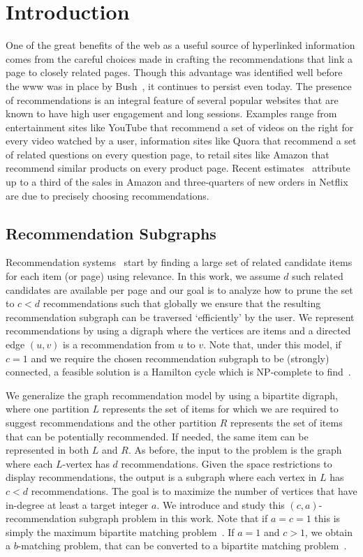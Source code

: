 
\section{Introduction}

One of the great benefits of the web as a useful source of hyperlinked
information comes from the careful choices made in crafting the
recommendations that link a page to closely related pages. Though this
advantage was identified well before the www was in place by
Bush~\cite{Bush45aswe}, it continues to persist even today. The
presence of recommendations is an integral feature of several popular
websites that are known to have high user engagement and long
sessions. Examples range from entertainment sites like YouTube that
recommend a set of videos on the right for every video watched by a
user, information sites like Quora that recommend a set of related
questions on every question page, to retail sites like Amazon that
recommend similar products on every product page. Recent
estimates~\cite{big-data-book13} attribute up to a third of the sales
in Amazon and three-quarters of new orders in Netflix are due to precisely choosing recommendations.

\subsection{Recommendation Subgraphs}
Recommendation systems~\cite{Schafer1999, Adomavicius2005,
  Resnick1997} start by finding a large set of related candidate items
for each item (or page) using relevance. In this work, we assume $d$
such related candidates are available per page and our goal is to
analyze how to prune the set to $c < d$ recommendations such that
globally we ensure that the resulting recommendation subgraph can be traversed
`efficiently' by the user. We represent recommendations
by using a digraph where the vertices are items and a directed
edge $(u, v)$ is a recommendation from $u$ to $v$. Note that, under
this model, if $c=1$ and we require the chosen recommendation subgraph
to be (strongly) connected, a feasible solution is a Hamilton cycle
which is NP-complete to find~\cite{CLRS2001}.

We generalize the graph recommendation model by using a bipartite
digraph, where one partition $L$ represents the set of items for which
we are required to suggest recommendations and the other partition $R$
represents the set of items that can be potentially recommended. If
needed, the same item can be represented in both $L$ and $R$.  As
before, the input to the problem is the graph where each
$L$-vertex has $d$ recommendations. Given the space restrictions to
display recommendations, the output is a subgraph where each vertex in
$L$ has $c < d$ recommendations. The goal is to maximize the number of
vertices that have in-degree at least a target integer $a$. We
introduce and study this $(c, a)$-recommendation subgraph problem in
this work.  Note that if $a=c=1$ this is simply the maximum bipartite
matching problem~\cite{LovaszPlummer1986}. If $a=1$ and $c > 1$, we
obtain a $b$-matching problem, that can be converted to a bipartite
matching problem~\cite{Gabow1983}.\vs

